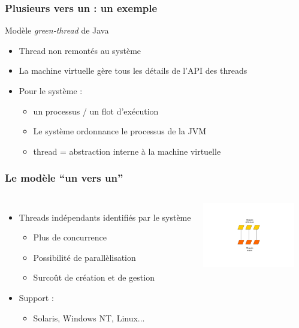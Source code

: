 \begin{frame}
 \frametitle{Plusieurs vers un : un exemple}
 \begin{exampleblock}{Modèle \textit{green-thread} de Java}
 \begin{itemize}
 \item Thread non remontés au système
 \item La machine virtuelle gère tous les détails de l'API des threads
 \item Pour le système :
 \begin{itemize}
 \item un processus / un flot d’exécution
 \item Le système ordonnance le processus de la JVM
 \item thread = abstraction interne à la machine virtuelle
 \end{itemize}
 \end{itemize}
 \end{exampleblock}
\end{frame}


\begin{frame}
 \frametitle{Le modèle ``un vers un''}
 \begin{columns}
 \begin{itemize}
 \item Threads indépendants identifiés par le système
 \begin{itemize}
 \item Plus de concurrence
 \item Possibilité de parallèlisation
 \item Surcoût de création et de gestion
 \end{itemize}
 \item Support :
 \begin{itemize}
 \item Solaris, Windows NT, Linux...
 \end{itemize}
 \end{itemize}
 \includegraphics[width=4cm]{../illustration/threads-1-1.pdf}
 \end{columns}
\end{frame}


